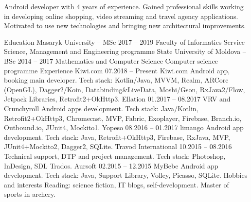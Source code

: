 \documentclass[12pt, a4paper]{article}
\begin{document}
\begin{minipage}{0.6\textwidth}
    Android developer with 4 years of experience. Gained professional
    skills working in developing online shopping, video streaming and
    travel agency applications. Motivated to use new technologies and
    bringing new architectural improvements.
    
    Education
    Masaryk University – MSc 2017 – 2019
    Faculty of Informatics
    Service Science, Management and Engineering programme
    State University of Moldova – BSc 2014 – 2017
    Mathematics and Computer Science
    Computer science programme
    Experience
    Kiwi.com 07.2018 – Present
    Kiwi.com Android app, booking main developer.
    Tech stack: Kotlin/Java, MVVM, Realm, ARCore (OpenGL),
    Dagger2/Koin, Databinding\&LiveData, Moshi/Gson,
    RxJava2/Flow, Jetpack Libraries, Retrofit2+OkHttp3.
    Ellation 01.2017 – 08.2017
    VRV and Crunchyroll Android apps development.
    Tech stack: Java/Kotlin, Retrofit2+OkHttp3, Chromecast, MVP,
    Fabric, Exoplayer, Firebase, Branch.io, Outbound.io, JUnit4,
    Mockito1.
    Yopeso 08.2016 – 01.2017
    limango Android app development.
    Tech stack: Java, Retrofit+OkHttp3, Firebase, RxJava, MVP,
    JUnit4+Mockito2, Dagger2, SQLite.
    Travod International 10.2015 – 08.2016
    Technical support, DTP and project management.
    Tech stack: Photoshop, InDesign, SDL Trados.
    Aursoft 02.2015 – 12.2015
    MyBebe Android app development.
    Tech stack: Java, Support Library, Volley, Picasso, SQLite.
    Hobbies and interests
    Reading: science fiction, IT blogs, self-development.
    Master of sports in archery.
\end{minipage}
\end{document}
